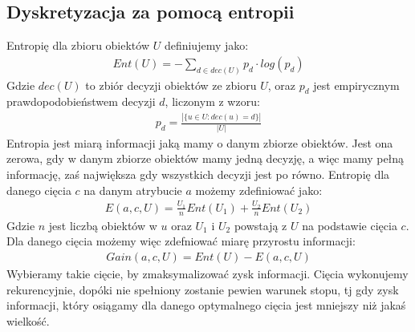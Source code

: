 \documentclass[magisterska]{pracamgr}
\theoremstyle{plain}
\theoremstyle{definition}
\theoremstyle{remark}
\begin{document}
\subsection{Dyskretyzacja za pomocą entropii}
Entropię dla zbioru obiektów $U$ definiujemy jako:
\begin{align*}
  Ent(U) = - \sum_{d \in dec(U)} p_d \cdot log(p_d)
\end{align*}
Gdzie $dec(U)$ to zbiór decyzji obiektów ze zbioru $U$, oraz $p_d$ jest 
empirycznym prawdopodobieństwem decyzji $d$, liczonym z wzoru:
\begin{align*}
  p_d = \frac{|\{u \in U: dec(u) = d\}|}{|U|}
\end{align*}
Entropia jest miarą informacji jaką mamy o danym zbiorze obiektów.
Jest ona zerowa, gdy w danym zbiorze obiektów mamy jedną decyzję, a więc 
mamy pełną informację, zaś największa gdy wszystkich decyzji jest po równo. 
Entropię dla danego cięcia $c$ na danym atrybucie $a$ możemy zdefiniować jako:
\begin{align*}
  E(a, c, U) = \frac{U_1}{n}Ent(U_1) + \frac{U_2}{n}Ent(U_2)
\end{align*}
Gdzie $n$ jest liczbą obiektów w $u$ oraz $U_1$ i $U_2$ powstają z $U$ na podstawie cięcia $c$.
Dla danego cięcia możemy więc zdefniować miarę przyrostu informacji:
\begin{align*}
 Gain(a, c, U) = Ent(U) - E(a, c, U)
\end{align*}
Wybieramy takie cięcie, by zmaksymalizować zysk informacji. Cięcia wykonujemy rekurencyjnie,
dopóki nie spełniony zostanie pewien warunek stopu, tj gdy zysk informacji, który osiągamy
dla danego optymalnego cięcia jest mniejszy niż jakaś wielkość.
\end{document}
